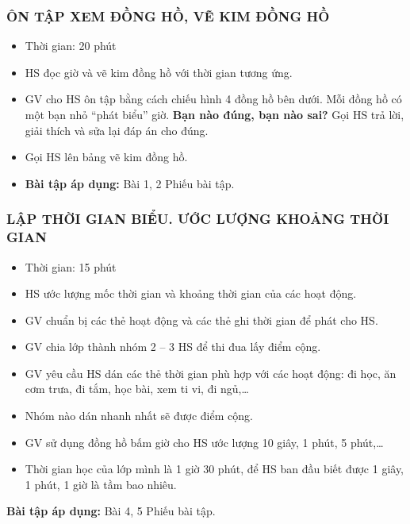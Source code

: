 \documentclass[../main.tex]{subfiles}
\begin{document}
\subsubsection{ÔN TẬP XEM ĐỒNG HỒ, VẼ KIM ĐỒNG HỒ}
\begin{hd}
    \begin{itemize}
        \item Thời gian: 20 phút
        \item HS đọc giờ và vẽ kim đồng hồ với thời gian tương ứng.
    \end{itemize}
\end{hd}
\begin{itemize}
    \item GV cho HS ôn tập bằng cách chiếu hình 4 đồng hồ bên dưới. Mỗi đồng hồ có một bạn nhỏ “phát biểu” giờ. \textbf{Bạn nào đúng, bạn nào sai?} Gọi HS trả lời, giải thích và sửa lại đáp án cho đúng.
\end{itemize}
\begin{itemize}
    \item Gọi HS lên bảng vẽ kim đồng hồ.
    \item \textbf{Bài tập áp dụng:} Bài 1, 2 Phiếu bài tập.
\end{itemize}

\subsubsection{LẬP THỜI GIAN BIỂU. ƯỚC LƯỢNG KHOẢNG THỜI GIAN}
\begin{hd}
    \begin{itemize}
        \item Thời gian: 15 phút
        \item HS ước lượng mốc thời gian và khoảng thời gian của các hoạt động.
    \end{itemize}
\end{hd}
\begin{itemize}
    \item GV chuẩn bị các thẻ hoạt động và các thẻ ghi thời gian để phát cho HS.
    \item GV chia lớp thành nhóm 2 -- 3 HS để thi đua lấy điểm cộng.
    \item GV yêu cầu HS dán các thẻ thời gian phù hợp với các hoạt động: đi học, ăn cơm trưa, đi tắm, học bài, xem ti vi, đi ngủ,\dots
    \item Nhóm nào dán nhanh nhất sẽ được điểm cộng.
\end{itemize}
\begin{itemize}
    \item GV sử dụng đồng hồ bấm giờ cho HS ước lượng 10 giây, 1 phút, 5 phút,\dots
    \item Thời gian học của lớp mình là 1 giờ 30 phút, để HS ban đầu biết được 1 giây, 1 phút, 1 giờ là tầm bao nhiêu.
\end{itemize}
\textbf{Bài tập áp dụng:} Bài 4, 5 Phiếu bài tập.
\end{document}
